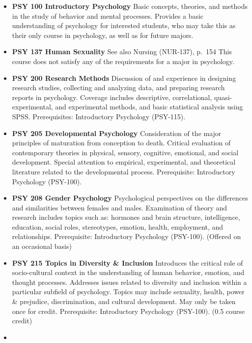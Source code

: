 \documentclass[
  letterpaper,
]{scrbook}
\providecommand{\tightlist}{%
  \setlength{\itemsep}{0pt}\setlength{\parskip}{0pt}}
\begin{document}
\begin{itemize}
\tightlist
\item
  \textbf{PSY 100 Introductory Psychology} Basic concepts, theories, and
  methods in the study of behavior and mental processes. Provides a
  basic understanding of psychology for interested students, who may
  take this as their only course in psychology, as well as for future
  majors.\\
\item
  \textbf{PSY 137 Human Sexuality} See also Nursing (NUR-137), p.~154
  This course does not satisfy any of the requirements for a major in
  psychology.
\item
  \textbf{PSY 200 Research Methods} Discussion of and experience in
  designing research studies, collecting and analyzing data, and
  preparing research reports in psychology. Coverage includes
  descriptive, correlational, quasi-experimental, and experimental
  methods, and basic statistical analysis using SPSS. Prerequisites:
  Introductory Psychology (PSY-115).\\
\item
  \textbf{PSY 205 Developmental Psychology} Consideration of the major
  principles of maturation from conception to death. Critical evaluation
  of contemporary theories in physical, sensory, cognitive, emotional,
  and social development. Special attention to empirical, experimental,
  and theoretical literature related to the developmental process.
  Prerequisite: Introductory Psychology (PSY-100).
\item
  \textbf{PSY 208 Gender Psychology} Psychological perspectives on the
  differences and similarities between females and males. Examination of
  theory and research includes topics such as: hormones and brain
  structure, intelligence, education, social roles, stereotypes,
  emotion, health, employment, and relationships. Prerequisite:
  Introductory Psychology (PSY-100). (Offered on an occasional basis)\\
\item
  \textbf{PSY 215 Topics in Diversity \& Inclusion} Introduces the
  critical role of socio-cultural context in the understanding of human
  behavior, emotion, and thought processes. Addresses issues related to
  diversity and inclusion within a particular subfield of psychology.
  Topics may include sexuality, health, power \& prejudice,
  discrimination, and cultural development. May only be taken once for
  credit. Prerequisite: Introductory Psychology (PSY-100). (0.5 course
  credit)
\item

\end{itemize}
\end{document}
